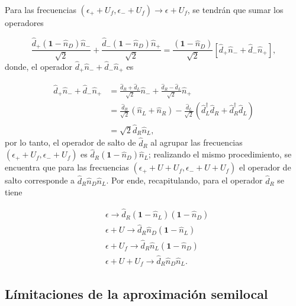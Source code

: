 \begin{appendixs}
Para las frecuencias $(\epsilon_{+}+U_{f},\epsilon_{-}+U_{f})\to \epsilon + U_{f}$, se tendrán que sumar los operadores 

\begin{equation*}
    \frac{\hat{d}_{+}(\textbf{1}-\hat{n}_{D})\hat{n}_{-} }{\sqrt{2}} + \frac{\hat{d}_{-}(\textbf{1}-\hat{n}_{D})\hat{n}_{+} }{\sqrt{2}} = \frac{(\textbf{1}-\hat{n}_{D})}{\sqrt{2}} [\hat{d}_{+}\hat{n}_{-} + \hat{d}_{-}\hat{n}_{+}],
\end{equation*}
donde, el operador $\hat{d}_{+}\hat{n}_{-} + \hat{d}_{-}\hat{n}_{+}$ es 

\begin{align*}
    \hat{d}_{+}\hat{n}_{-} + \hat{d}_{-}\hat{n}_{+} & = \frac{\hat{d}_{R}+\hat{d}_{L}}{\sqrt{2}}\hat{n}_{-} + \frac{\hat{d}_{R}-\hat{d}_{L}}{\sqrt{2}}\hat{n}_{+}  \\
    & = \frac{\hat{d}_{R}}{\sqrt{2}}(\hat{n}_{L}+\hat{n}_{R}) - \frac{\hat{d}_{L}}{\sqrt{2}}(\hat{d}^{\dagger}_{L}\hat{d}_{R}+\hat{d}^{\dagger}_{R}\hat{d}_{L}) \\
    & = \sqrt{2}\hat{d}_{R}\hat{n}_{L},
\end{align*}
por lo tanto, el operador de salto de $\hat{d}_{R}$ al agrupar las frecuencias $(\epsilon_{+}+U_{f}, \epsilon_{-}+U_{f})$ es $\hat{d}_{R}(\textbf{1} - \hat{n}_{D})\hat{n}_{L}$; realizando el mismo procedimiento, se encuentra que para las frecuencias $(\epsilon_{+}+U+U_{f}, \epsilon_{-}+U+U_{f})$ el operador de salto corresponde a $\hat{d}_{R}\hat{n}_{D}\hat{n}_{L}$. Por ende, recapitulando, para el operador $\hat{d}_{R}$ se tiene

\begin{align*}
    &\epsilon \to \hat{d}_{R}(\textbf{1}-\hat{n}_{L})(\textbf{1}-\hat{n}_{D})\\
   &\epsilon + U \to \hat{d}_{R}\hat{n}_{D}(\textbf{1}-\hat{n}_{L})\\
    &\epsilon +U_{f}\to \hat{d}_{R}\hat{n}_{L}(\textbf{1}-\hat{n}_{D})\\
    &\epsilon +U+U_{f}\to \hat{d}_{R}\hat{n}_{D}\hat{n}_{L}.
\end{align*}

\label{apendix5frecuencygroup}

\subsection{Límitaciones de la aproximación semilocal}

\label{apendix5límites}


\end{appendixs}
